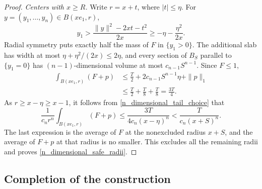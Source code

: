 \documentclass[12pt]{amsart}
\numberwithin{equation}{section}
\begin{document}
\begin{proof}
\medskip
\noindent\textit{Centers with $x\geq R$.}
Write $r=x+t$, where $|t|\leq\eta$. For
$y=(y_1,\ldots,y_n)\in B(xe_1,r)$,
\[
y_1>\frac{\|y\|^2-2xt-t^2}{2x}
       \geq-\eta-\frac{\eta^2}{2x}.
\]
Radial symmetry puts exactly half the mass of $F$ in $\{y_1>0\}$.
The additional slab has width at most
$\eta+\eta^2/(2x)\leq2\eta$, and every section of $B_S$ parallel
to $\{y_1=0\}$ has $(n-1)$-dimensional volume at most
$c_{n-1}S^{n-1}$. Since $F\leq1$,
\begin{align*}
\int_{B(xe_1,r)}(F+p)
 &\leq\frac{T}{2}+2c_{n-1}S^{n-1}\eta+\|p\|_1\\
 &\leq\frac{T}{2}+\frac{T}{8}+\frac{T}{8}
       =\frac{3T}{4}.
\end{align*}
As $r\geq x-\eta\geq x-1$, it follows from
\eqref{n_dimensional_tail_choice} that
\[
\frac{1}{c_nr^n}\int_{B(xe_1,r)}(F+p)
 \leq\frac{3T}{4c_n(x-\eta)^n}
 <\frac{T}{c_n(x+S)^n}.
\]
The last expression is the average of $F$ at the nonexcluded radius
$x+S$, and the average of $F+p$ at that radius is no smaller.
This excludes all the remaining radii and proves
\eqref{n_dimensional_safe_radii}.
\end{proof}

\subsection{Completion of the construction}
\end{document}
